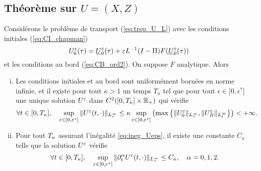 \subsection{Théorème sur $U = (X,Z)$}

\begin{theorem} \label{thm:regu_U}
Considérons le problème de transport (\ref{eq:trsp_U_L}) avec les conditions initiales (\ref{eq:CI_chapman})
$$ U_0^{\varepsilon}(\tau) = \underline{U}_0^{\varepsilon}(\tau) + \varepsilon L^{-1} (I-\Pi) F(\underline{U}_0^{\varepsilon}(\tau)) $$
et les conditions au bord (\ref{eq:CB_ord2}). On suppose $F$ analytique. Alors 
\begin{enumerate}[(i)]
\item Les conditions initiales et au bord sont uniformément bornées en norme infinie, et il existe pour tout $\kappa > 1$ un temps $T_{\kappa}$ tel que pour tout $\epsilon\in]0,\epsilon^*]$ une unique solution $U^{\varepsilon}$ dans $C^2([0,T_{\kappa}]\times\mathbb{R}_+)$ qui vérifie 
\begin{equation} \label{eq:ineg_Ueps}
\forall t\in[0,T_{\kappa}],\quad \sup_{\varepsilon\in]0,\varepsilon^*]} \| U^{\varepsilon}(t,\cdot) \|_{L^{\infty}_{\tau}} \leq \kappa \sup_{\varepsilon\in]0,\varepsilon^*]} \left(\max\left\{ \|U_0^{\varepsilon}\|_{L^{\infty}_{\tau}}, \|U_B^{\varepsilon}\|_{L^{\infty}_t} \right\} \right) < +\infty . 
\end{equation}

\item Pour tout $T_{\kappa}$ assurant l'inégalité \eqref{eq:ineg_Ueps}, il existe une constante $C_{\kappa}$ telle que la solution $U^{\varepsilon}$ vérifie 
\begin{equation} \label{ineq:dtUeps}
\forall t\in[0,T_{\kappa}], \quad \sup_{\varepsilon\in]0,\varepsilon^*]} \|\partial_t^{\alpha} U^{\varepsilon}(t,\cdot)\|_{L^{\infty}_{\tau}} \leq C_{\kappa}, \quad \alpha = 0,1,2.
\end{equation}
\end{enumerate}
\end{theorem}

